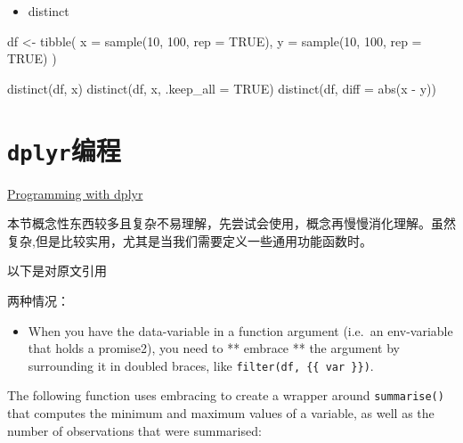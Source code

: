 \documentclass[
]{book}
\newenvironment{Shaded}{\begin{snugshade}}{\end{snugshade}}
\newcommand{\AttributeTok}[1]{\textcolor[rgb]{0.77,0.63,0.00}{#1}}
\newcommand{\ConstantTok}[1]{\textcolor[rgb]{0.00,0.00,0.00}{#1}}
\newcommand{\DecValTok}[1]{\textcolor[rgb]{0.00,0.00,0.81}{#1}}
\newcommand{\FunctionTok}[1]{\textcolor[rgb]{0.00,0.00,0.00}{#1}}
\newcommand{\NormalTok}[1]{#1}
\newcommand{\OtherTok}[1]{\textcolor[rgb]{0.56,0.35,0.01}{#1}}
\newcommand{\SpecialCharTok}[1]{\textcolor[rgb]{0.00,0.00,0.00}{#1}}
\providecommand{\tightlist}{%
  \setlength{\itemsep}{0pt}\setlength{\parskip}{0pt}}
\begin{document}
\begin{itemize}
\tightlist
\item
  distinct
\end{itemize}

\begin{Shaded}
\begin{Highlighting}[]
\NormalTok{df }\OtherTok{\textless{}{-}} \FunctionTok{tibble}\NormalTok{(}
  \AttributeTok{x =} \FunctionTok{sample}\NormalTok{(}\DecValTok{10}\NormalTok{, }\DecValTok{100}\NormalTok{, }\AttributeTok{rep =} \ConstantTok{TRUE}\NormalTok{),}
  \AttributeTok{y =} \FunctionTok{sample}\NormalTok{(}\DecValTok{10}\NormalTok{, }\DecValTok{100}\NormalTok{, }\AttributeTok{rep =} \ConstantTok{TRUE}\NormalTok{)}
\NormalTok{)}

\FunctionTok{distinct}\NormalTok{(df, x)}
\FunctionTok{distinct}\NormalTok{(df, x, }\AttributeTok{.keep\_all =} \ConstantTok{TRUE}\NormalTok{)}
\FunctionTok{distinct}\NormalTok{(df, }\AttributeTok{diff =} \FunctionTok{abs}\NormalTok{(x }\SpecialCharTok{{-}}\NormalTok{ y))}
\end{Highlighting}
\end{Shaded}

\hypertarget{dplyr-programming}{%
\section{\texorpdfstring{\texttt{dplyr}编程}{dplyr编程}}\label{dplyr-programming}}

\href{https://cloud.r-project.org/web/packages/dplyr/vignettes/programming.html}{Programming with dplyr}

本节概念性东西较多且复杂不易理解，先尝试会使用，概念再慢慢消化理解。虽然复杂,但是比较实用，尤其是当我们需要定义一些通用功能函数时。

以下是对原文引用

两种情况：

\begin{itemize}
\tightlist
\item
  When you have the data-variable in a function argument (i.e.~an env-variable that holds a promise2), you need to ** embrace ** the argument by surrounding it in doubled braces, like \texttt{filter(df,\ \{\{\ var\ \}\})}.
\end{itemize}

The following function uses embracing to create a wrapper around \texttt{summarise()} that computes the minimum and maximum values of a variable, as well as the number of observations that were summarised:
\end{document}
